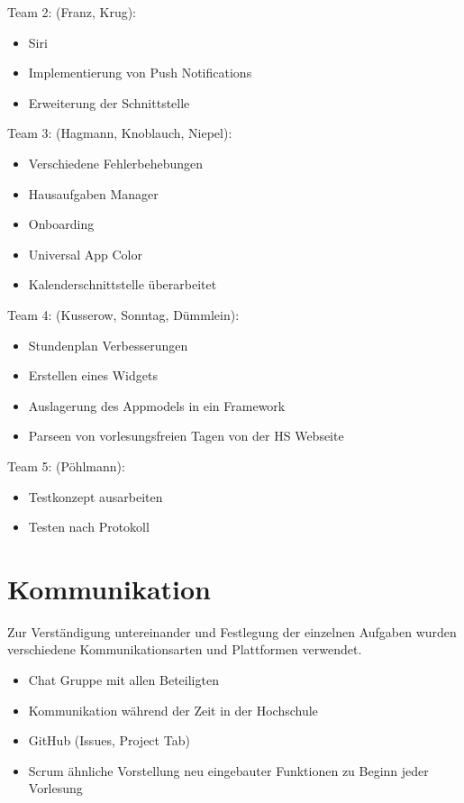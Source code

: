 Team 2: (Franz, Krug):
\begin{itemize}
\item Siri
\item Implementierung von Push Notifications
\item Erweiterung der Schnittstelle
\end{itemize}


Team 3: (Hagmann, Knoblauch, Niepel):
\begin{itemize}
\item Verschiedene Fehlerbehebungen
\item Hausaufgaben Manager
\item Onboarding 
\item Universal App Color
\item Kalenderschnittstelle überarbeitet
\end{itemize}


Team 4: (Kusserow, Sonntag, Dümmlein):
\begin{itemize}
\item Stundenplan Verbesserungen
\item Erstellen eines Widgets
\item Auslagerung des Appmodels in ein Framework
\item Parseen von vorlesungsfreien Tagen von der HS Webseite
\end{itemize}


Team 5: (Pöhlmann):
\begin{itemize}
\item Testkonzept ausarbeiten
\item Testen nach Protokoll
\end{itemize}


\section{Kommunikation}
Zur Verständigung untereinander und Festlegung der einzelnen Aufgaben wurden verschiedene Kommunikationsarten und Plattformen verwendet.
\begin{itemize}
\item Chat Gruppe mit allen Beteiligten
\item Kommunikation während der Zeit in der Hochschule
\item GitHub (Issues, Project Tab)
\item Scrum ähnliche Vorstellung neu eingebauter Funktionen zu Beginn jeder Vorlesung
\end{itemize}


